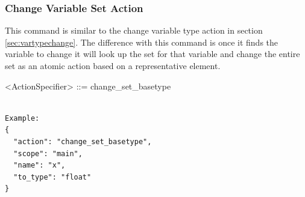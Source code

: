 \documentclass[natbib]{article}
\begin{document}
\subsubsection{Change Variable Set Action}
This command is similar to the change variable type action in section \ref{sec:vartypechange}. 
The difference with this command is once it finds the variable to change it will look up the set for 
that variable and change the entire set as an atomic action based on a representative element.

\begin{grammar}
<ActionSpecifier> ::= change_set_basetype
\end{grammar}
\begin{verbatim}

Example:
{
  "action": "change_set_basetype",
  "scope": "main",
  "name": "x",
  "to_type": "float"
}
\end{verbatim}



\end{document}
